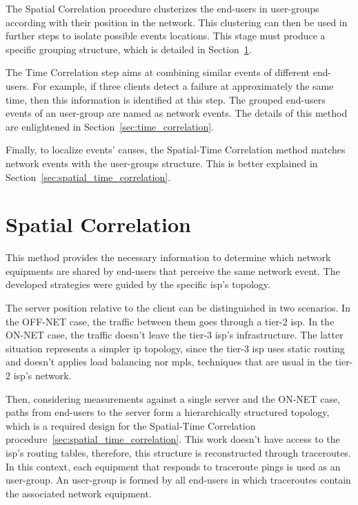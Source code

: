 The Spatial Correlation procedure clusterizes the end-users in user-groups
according with their position in the network. This clustering can then be used
in further steps to isolate possible events locations.
This stage must produce a specific grouping structure, which is detailed in
Section~\ref{sec:spatial_correlation}.

The Time Correlation step aims at combining similar events of different
end-users. For example, if three clients detect a failure at approximately
the same time, then this information is identified at this step.
The grouped end-users events of an user-group are named as network events.
The details of this method are enlightened in
Section~\ref{sec:time_correlation}.

Finally, to localize events' causes, the Spatial-Time Correlation method
matches network events with the user-groups structure.
This is better explained in Section~\ref{sec:spatial_time_correlation}.

\section{Spatial Correlation}
\label{sec:spatial_correlation}

This method provides the necessary information to determine which network
equipments
are shared by end-users that perceive the same network event.
The developed strategies were guided by the specific \gls*{isp}'s topology.

The server position relative to the client
can be distinguished in two scenarios.
In the OFF-NET case, the traffic between them
goes through a tier-2 \gls*{isp}\@.
In the ON-NET case, the traffic
doesn't leave the tier-3 \gls*{isp}'s infrastructure.
The latter situation represents a simpler \gls*{ip} topology, since the tier-3 \gls*{isp}
uses static routing and
doesn't applies load balancing nor \gls*{mpls}, techniques that are usual in the tier-2
\gls*{isp}'s network.

Then, considering measurements against a single server and the ON-NET
case, paths from end-users to the server form a hierarchically
structured topology, which is a required design for the
Spatial-Time Correlation procedure~\ref{sec:spatial_time_correlation}.
This work doesn't have access to the \gls*{isp}'s routing tables,
therefore, this structure is reconstructed through traceroutes.
In this context, each equipment that responds to traceroute
pings is used as an user-group.
An user-group is formed by all end-users in which traceroutes contain the
associated network equipment.

